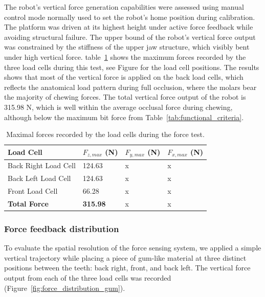 The robot's vertical force generation capabilities were assessed using manual control mode normally used to set the robot's home position during calibration. 
The platform was driven at its highest height under active force feedback while avoiding structural failure. The upper bound of the robot's vertical force 
output was constrained by the stiffness of the upper jaw structure, which visibly bent under high vertical force. table~\ref{tab:max_force} shows the 
maximum forces recorded by the three load cells during this test, see Figure %
for the load cell positions. The results shows that most of the vertical force is applied on the back load cells, which reflects the 
anatomical load pattern during full occlusion, where the molars bear the majority of chewing forces. The total vertical force output of the robot is 
315.98 N, which is well within the average occlusal force during chewing, although below the maximum bit force from Table~\ref{tab:functional_criteria}.
\begin{table}[H]
    \centering
    \begin{tabular}{p{4cm} p{2cm} p{2cm} p{2cm}}
        \toprule
        \textbf{Load Cell} & \textbf{$F_{z,max}$ (N)} & \textbf{$F_{y,max}$ (N)} & \textbf{$F_{x,max}$ (N)} \\
        \midrule
        Back Right Load Cell & 124.63 & x & x \\
        Back Left Load Cell & 124.63 & x & x  \\
        Front Load Cell & 66.28 & x & x  \\
        \midrule
        \textbf{Total Force} & \textbf{315.98} & x & x \\
        \bottomrule       
    \end{tabular}
    \caption{Maximal forces recorded by the load cells during the force test.}
    \label{tab:max_force}
\end{table}


\subsubsection{Force feedback distribution}

To evaluate the spatial resolution of the force sensing system, we applied a simple vertical trajectory while placing a piece of gum-like material 
at three distinct positions between the teeth: back right, front, and back left. The vertical force output from each of the three load cells was 
recorded (Figure~\ref{fig:force_distribution_gum}).

